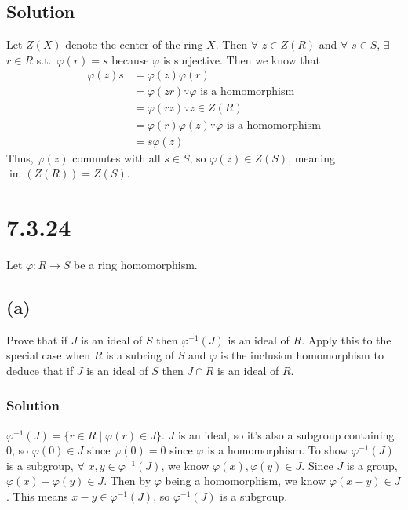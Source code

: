 \documentclass[fleqn]{article}
\DeclareMathOperator{\im}{im}
\begin{document}
        \subsection{Solution}
        Let $Z(X)$ denote the center of the ring $X$.  Then $\forall$ $z \in Z(R)$ and $\forall$ $s \in S$, $\exists$ $r \in R$ s.t.\ $\varphi(r) = s$ because $\varphi$ is surjective.  Then we know that
        \begin{align}
            \varphi(z) s &= \varphi(z) \varphi(r) \\
                &= \varphi(zr) \because{} \varphi \text{ is a homomorphism} \\
                &= \varphi(rz) \because{} z \in Z(R) \\
                &= \varphi(r) \varphi(z) \because{} \varphi \text{ is a homomorphism} \\
                &= s \varphi(z)
        \end{align}
        Thus, $\varphi(z)$ commutes with all $s \in S$, so $\varphi(z) \in Z(S)$, meaning $\im(Z(R)) = Z(S)$.
        
    \section{7.3.24}
    Let $\varphi: R \to S$ be a ring homomorphism.
        
        \subsection{(a)}
        Prove that if $J$ is an ideal of $S$ then $\varphi^{-1}(J)$ is an ideal of $R$.  Apply this to the special case when $R$ is a subring of $S$ and $\varphi$ is the inclusion homomorphism to deduce that if $J$ is an ideal of $S$ then $J \cap R$ is an ideal of $R$.
            
            \subsubsection{Solution}
            $\varphi^{-1}(J) = \{r \in R \mid \varphi(r) \in J\}$.  $J$ is an ideal, so it's also a subgroup containing 0, so $\varphi(0) \in J$ since $\varphi(0) = 0$ since $\varphi$ is a homomorphism.  To show $\varphi^{-1}(J)$ is a subgroup, $\forall$ $x, y \in \varphi^{-1}(J)$, we know $\varphi(x), \varphi(y) \in J$.  Since $J$ is a group, $\varphi(x) - \varphi(y) \in J$.  Then by $\varphi$ being a homomorphism, we know $\varphi(x - y) \in J$.  This means $x - y \in \varphi^{-1}(J)$, so $\varphi^{-1}(J)$ is a subgroup.  
            
\end{document}
